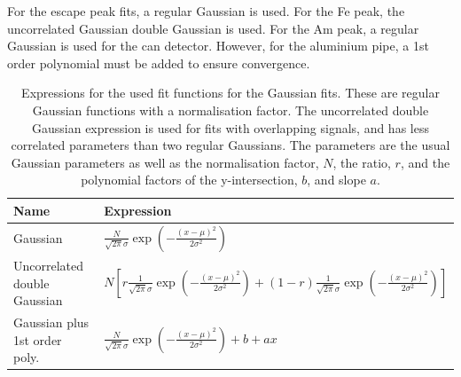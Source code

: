For the escape peak fits, a regular Gaussian is used. For the Fe peak, the uncorrelated Gaussian double Gaussian is used. For the Am peak, a regular Gaussian is used for the can detector. However, for the aluminium pipe, a 1st order polynomial must be added to ensure convergence.

\begin{table}[htb!]
\begin{tabular}{ll}
\textbf{Name}                 & \textbf{Expression} \\ \hline
Gaussian                      & $\frac{N}{\sqrt{2\pi}\sigma}\exp{\left(-\frac{\left(x-\mu\right)^2}{2\sigma^2}\right)}$                    \\
Uncorrelated double Gaussian  & $N\left[r\frac{1}{\sqrt{2\pi}\sigma}\exp{\left(-\frac{\left(x-\mu\right)^2}{2\sigma^2}\right)}+(1-r)\frac{1}{\sqrt{2\pi}\sigma}\exp{\left(-\frac{\left(x-\mu\right)^2}{2\sigma^2}\right)}\right]$                     \\
Gaussian plus 1st order poly. & $\frac{N}{\sqrt{2\pi}\sigma}\exp{\left(-\frac{\left(x-\mu\right)^2}{2\sigma^2}\right)} + b + ax$                   
\end{tabular}
\caption{Expressions for the used fit functions for the Gaussian fits. These are regular Gaussian functions with a normalisation factor. The uncorrelated double Gaussian expression is used for fits with overlapping signals, and has less correlated parameters than two regular Gaussians. The parameters are the usual Gaussian parameters as well as the normalisation factor, $N$, the ratio, $r$, and the polynomial factors of the y-intersection, $b$, and slope $a$.}
\label{tab:fitfuncchannelfits}
\end{table}

